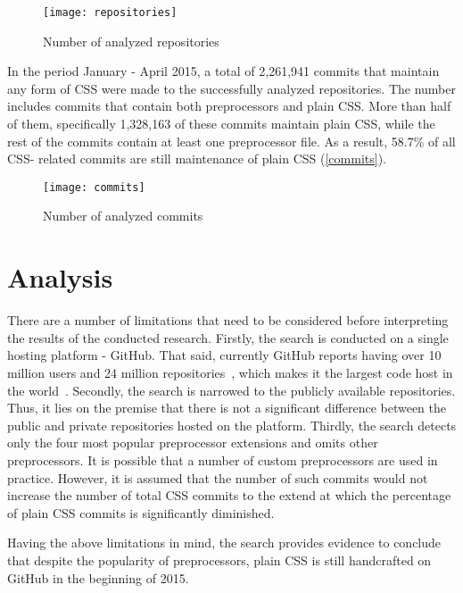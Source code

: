 \begin{figure}[h!]
  \centering
  \caption{
  	\label{repositories}
  	Number of analyzed repositories}
  \texttt{[image: repositories]}
\end{figure}

In the period January - April 2015, a total of 2,261,941 commits that maintain
any form of CSS were made to the successfully analyzed repositories. The
number includes commits that contain both preprocessors and plain CSS. More
than half of them, specifically 1,328,163 of these commits maintain plain CSS,
while the rest of the commits contain at least one preprocessor file. As a
result, 58.7\% of all CSS- related commits are still maintenance of plain CSS
(\autoref{commits}).

\begin{figure}[h!]
  \centering
  \caption{
  	\label{commits}
  	Number of analyzed commits}
  \texttt{[image: commits]}
\end{figure}

\section{Analysis}

There are a number of limitations that need to be considered before
interpreting the results of the conducted research. Firstly, the search is
conducted on a single hosting platform - GitHub. That said, currently GitHub
reports having over 10 million users and 24 million
repositories~\cite{GitHub}, which makes it the largest code host in the
world~\cite{gousios2014lean}. Secondly, the search is narrowed to the publicly
available repositories. Thus, it lies on the premise that there is not a
significant difference between the public and private repositories hosted on
the platform. Thirdly, the search detects only the four most popular
preprocessor extensions and omits other preprocessors. It is possible that a
number of custom preprocessors are used in practice. However, it is assumed
that the number of such commits would not increase the number of total CSS
commits to the extend at which the percentage of plain CSS commits is
significantly diminished.

Having the above limitations in mind, the search provides evidence to conclude
that despite the popularity of preprocessors, plain CSS is still handcrafted
on GitHub in the beginning of 2015.

